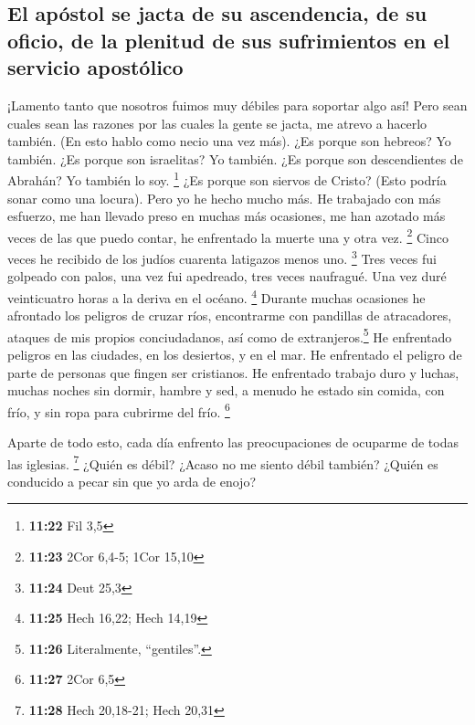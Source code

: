 \hypertarget{el-apuxf3stol-se-jacta-de-su-ascendencia-de-su-oficio-de-la-plenitud-de-sus-sufrimientos-en-el-servicio-apostuxf3lico}{%
\subsection{El apóstol se jacta de su ascendencia, de su oficio, de la
plenitud de sus sufrimientos en el servicio
apostólico}\label{el-apuxf3stol-se-jacta-de-su-ascendencia-de-su-oficio-de-la-plenitud-de-sus-sufrimientos-en-el-servicio-apostuxf3lico}}

 ¡Lamento tanto que nosotros fuimos muy débiles para
soportar algo así! Pero sean cuales sean las razones por las cuales la
gente se jacta, me atrevo a hacerlo también. (En esto hablo como necio
una vez más).  ¿Es porque son hebreos? Yo también. ¿Es
porque son israelitas? Yo también. ¿Es porque son descendientes de
Abrahán? Yo también lo soy. \footnote{\textbf{11:22} Fil 3,5}
 ¿Es porque son siervos de Cristo? (Esto podría sonar
como una locura). Pero yo he hecho mucho más. He trabajado con más
esfuerzo, me han llevado preso en muchas más ocasiones, me han azotado
más veces de las que puedo contar, he enfrentado la muerte una y otra
vez. \footnote{\textbf{11:23} 2Cor 6,4-5; 1Cor 15,10} 
Cinco veces he recibido de los judíos cuarenta latigazos menos uno.
\footnote{\textbf{11:24} Deut 25,3}  Tres veces fui
golpeado con palos, una vez fui apedreado, tres veces naufragué. Una vez
duré veinticuatro horas a la deriva en el océano. \footnote{\textbf{11:25}
  Hech 16,22; Hech 14,19}  Durante muchas ocasiones he
afrontado los peligros de cruzar ríos, encontrarme con pandillas de
atracadores, ataques de mis propios conciudadanos, así como de
extranjeros.\footnote{\textbf{11:26} Literalmente, ``gentiles''.} He
enfrentado peligros en las ciudades, en los desiertos, y en el mar. He
enfrentado el peligro de parte de personas que fingen ser cristianos.
 He enfrentado trabajo duro y luchas, muchas noches sin
dormir, hambre y sed, a menudo he estado sin comida, con frío, y sin
ropa para cubrirme del frío. \footnote{\textbf{11:27} 2Cor 6,5}

 Aparte de todo esto, cada día enfrento las
preocupaciones de ocuparme de todas las iglesias. \footnote{\textbf{11:28}
  Hech 20,18-21; Hech 20,31}  ¿Quién es débil? ¿Acaso no
me siento débil también? ¿Quién es conducido a pecar sin que yo arda de
enojo?


